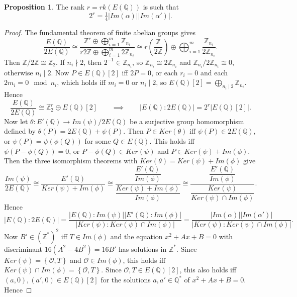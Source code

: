 \documentclass{article}
\newcommand{\Z}{\mathbb{Z}}
\newcommand{\Q}{\mathbb{Q}}
\newcommand{\rb}[1]{\left( #1 \right)}
\renewcommand{\sb}[1]{\left[ #1 \right]}
\newcommand{\cb}[1]{\left\{ #1 \right\}}
\newcommand{\abs}[1]{\left\lvert #1 \right\rvert}
\theoremstyle{definition}
\newtheorem{proposition}{Proposition}[subsection]
\begin{document}
\begin{proposition}
The rank $ r = rk\rb{E\rb{\Q}} $ is such that
$$ 2^r = \tfrac{1}{4}\abs{Im\rb{\alpha}}\abs{Im\rb{\alpha'}}. $$
\end{proposition}

\begin{proof}
The fundamental theorem of finite abelian groups gives
$$ \dfrac{E\rb{\Q}}{2E\rb{\Q}} \cong \dfrac{\Z^r \oplus \bigoplus_{i = 1}^m \Z_{n_i}}{r2\Z \oplus \bigoplus_{i = 1}^m 2\Z_{n_i}} \cong r\rb{\dfrac{\Z}{2\Z}} \oplus \bigoplus_{i = 1}^m \dfrac{\Z_{n_i}}{2\Z_{n_i}}. $$
Then $ \Z / 2\Z \cong \Z_2 $. If $ n_i \nmid 2 $, then $ 2^{-1} \in \Z_{n_i} $, so $ \Z_{n_i} \cong 2\Z_{n_i} $ and $ \Z_{n_i} / 2\Z_{n_i} \cong 0 $, otherwise $ n_i \mid 2 $. Now $ P \in E\rb{\Q}\sb{2} $ iff $ 2P = 0 $, or each $ r_i = 0 $ and each $ 2m_i = 0 \mod n_i $, which holds iff $ m_i = 0 $ or $ n_i \mid 2 $, so $ E\rb{\Q}\sb{2} = \bigoplus_{n_i \mid 2} \Z_{n_i} $. Hence
$$ \dfrac{E\rb{\Q}}{2E\rb{\Q}} \cong \Z^r_2 \oplus E\rb{\Q}\sb{2} \qquad \implies \qquad \abs{E\rb{\Q} : 2E\rb{\Q}} = 2^r\abs{E\rb{\Q}\sb{2}}. $$
Now let $ \theta : E'\rb{\Q} \to Im\rb{\psi} / 2E\rb{\Q} $ be a surjective group homomorphism defined by $ \theta\rb{P} = 2E\rb{\Q} + \psi\rb{P} $. Then $ P \in Ker\rb{\theta} $ iff $ \psi\rb{P} \in 2E\rb{\Q} $, or $ \psi\rb{P} = \psi\rb{\phi\rb{Q}} $ for some $ Q \in E\rb{\Q} $. This holds iff $ \psi\rb{P - \phi\rb{Q}} = 0 $, or $ P - \phi\rb{Q} \in Ker\rb{\psi} $ and $ P \in Ker\rb{\psi} + Im\rb{\phi} $. Then the three isomorphism theorems with $ Ker\rb{\theta} = Ker\rb{\psi} + Im\rb{\phi} $ give
$$ \dfrac{Im\rb{\psi}}{2E\rb{\Q}} \cong \dfrac{E'\rb{\Q}}{Ker\rb{\psi} + Im\rb{\phi}} \cong \dfrac{\dfrac{E'\rb{\Q}}{Im\rb{\phi}}}{\dfrac{Ker\rb{\psi} + Im\rb{\phi}}{Im\rb{\phi}}} \cong \dfrac{\dfrac{E'\rb{\Q}}{Im\rb{\phi}}}{\dfrac{Ker\rb{\psi}}{Ker\rb{\psi} \cap Im\rb{\phi}}}. $$
Hence
$$ \abs{E\rb{\Q} : 2E\rb{\Q}} = \dfrac{\abs{E\rb{\Q} : Im\rb{\psi}}\abs{E'\rb{\Q} : Im\rb{\phi}}}{\abs{Ker\rb{\psi} : Ker\rb{\psi} \cap Im\rb{\phi}}} = \dfrac{\abs{Im\rb{\alpha}}\abs{Im\rb{\alpha'}}}{\abs{Ker\rb{\psi} : Ker\rb{\psi} \cap Im\rb{\phi}}}. $$
Now $ B' \in \rb{\Z^*}^2 $ iff $ T \in Im\rb{\phi} $ and the equation $ x^2 + Ax + B = 0 $ with discriminant $ 16\rb{A^2 - 4B^2} = 16B' $ has solutions in $ \Z^* $. Since $ Ker\rb{\psi} = \cb{\mathcal{O}, T} $ and $ \mathcal{O} \in Im\rb{\phi} $, this holds iff $ Ker\rb{\psi} \cap Im\rb{\phi} = \cb{\mathcal{O}, T} $. Since $ \mathcal{O}, T \in E\rb{\Q}\sb{2} $, this also holds iff $ \rb{a, 0}, \rb{a', 0} \in E\rb{\Q}\sb{2} $ for the solutions $ a, a' \in \Q^* $ of $ x^2 + Ax + B = 0 $. Hence

\end{proof}
\end{document}
